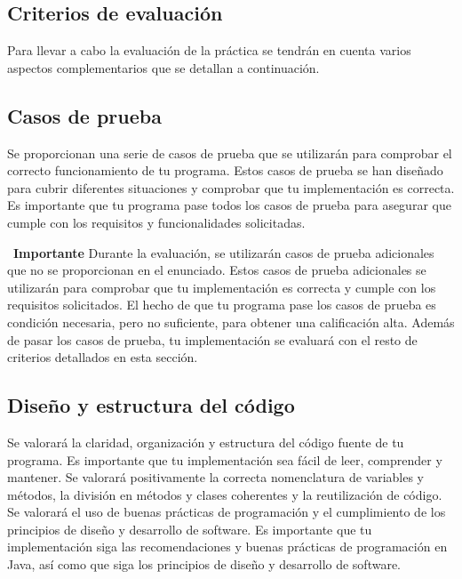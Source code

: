 \documentclass[
    a4paper, %
    12pt, %
]{CSSullivanBusinessReport}
\begin{document}
\newpage
\begin{twothirdswidth}
\section{Criterios de evaluación}\label{sec:criterios-evaluacion}
Para llevar a cabo la evaluación de la práctica se tendrán en cuenta varios aspectos complementarios que se detallan a continuación.
\subsection{Casos de prueba}\label{sec:criterios-casos-prueba}
Se proporcionan una serie de casos de prueba que se utilizarán para comprobar el correcto funcionamiento de tu programa. Estos casos de prueba se han diseñado para cubrir diferentes situaciones y comprobar que tu implementación es correcta. Es importante que tu programa pase todos los casos de prueba para asegurar que cumple con los requisitos y funcionalidades solicitadas.

\faExclamation~\textbf{Importante} Durante la evaluación, se utilizarán casos de prueba adicionales que no se proporcionan en el enunciado. Estos casos de prueba adicionales se utilizarán para comprobar que tu implementación es correcta y cumple con los requisitos solicitados. El hecho de que tu programa pase los casos de prueba es condición necesaria, pero no suficiente, para obtener una calificación alta. Además de pasar los casos de prueba, tu implementación se evaluará con el resto de criterios detallados en esta sección.
\subsection{Diseño y estructura del código}\label{sec:criterios-diseno}
Se valorará la claridad, organización y estructura del código fuente de tu programa. Es importante que tu implementación sea fácil de leer, comprender y mantener. Se valorará positivamente la correcta nomenclatura de variables y métodos, la división en métodos y clases coherentes y la reutilización de código. Se valorará el uso de buenas prácticas de programación y el cumplimiento de los principios de diseño y desarrollo de software. Es importante que tu implementación siga las recomendaciones y buenas prácticas de programación en Java, así como que siga los principios de diseño y desarrollo de software.


\end{twothirdswidth}
\end{document}
